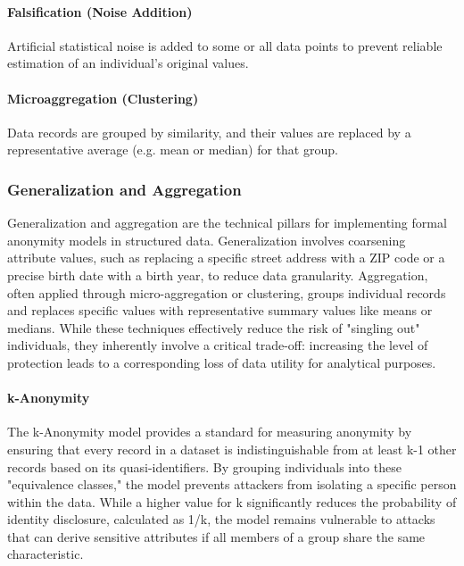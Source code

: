 \paragraph{Falsification (Noise Addition)}
Artificial statistical noise is added to some or all data points to prevent reliable estimation of an individual's original values.
\autocite[85--86]{Krebs2022}
\autocite[36]{schwartmann2022praxisleitfaden}

\paragraph{Microaggregation (Clustering)}
Data records are grouped by similarity, and their values are replaced by a representative average (e.g. mean or median) for that group.
\autocite[86]{Krebs2022}


\subsubsection{Generalization and Aggregation}

Generalization and aggregation are the technical pillars for implementing formal anonymity models in structured data. Generalization involves coarsening attribute values, such as replacing a specific street address with a ZIP code or a precise birth date with a birth year, to reduce data granularity. Aggregation, often applied through micro-aggregation or clustering, groups individual records and replaces specific values with representative summary values like means or medians. While these techniques effectively reduce the risk of "singling out" individuals, they inherently involve a critical trade-off: increasing the level of protection leads to a corresponding loss of data utility for analytical purposes.
\autocite[86--89, 131, 138]{Krebs2022}
\autocite[33--34]{schwartmann2022praxisleitfaden}

\paragraph{k-Anonymity}
The k-Anonymity model provides a standard for measuring anonymity by ensuring that every record in a dataset is indistinguishable from at least k-1 other records based on its quasi-identifiers. By grouping individuals into these "equivalence classes," the model prevents attackers from isolating a specific person within the data. While a higher value for k significantly reduces the probability of identity disclosure, calculated as 1/k, the model remains vulnerable to attacks that can derive sensitive attributes if all members of a group share the same characteristic.
\autocite[89--92, 138]{Krebs2022}
\autocite[44--46]{gmdsbvd2024praxishilfe}
\autocite[33--34]{schwartmann2022praxisleitfaden}

